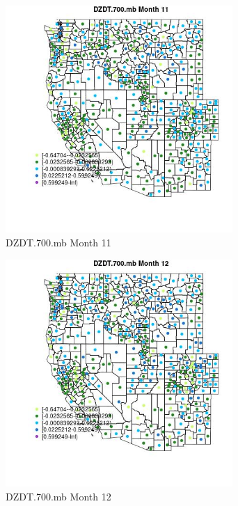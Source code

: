 \begin{figure} 
\centering  
\includegraphics[width=0.77\textwidth]{Code_Outputs/df_report_ML_predictors_CountyCentroid_Locations_Dates_2008-01-01to2018-12-31_MapObsMo11DZDT700mb.jpg} 
\caption{\label{fig:df_report_ML_predictors_CountyCentroid_Locations_Dates_2008-01-01to2018-12-31MapObsMo11DZDT700mb}DZDT.700.mb Month 11} 
\end{figure} 
 

\begin{figure} 
\centering  
\includegraphics[width=0.77\textwidth]{Code_Outputs/df_report_ML_predictors_CountyCentroid_Locations_Dates_2008-01-01to2018-12-31_MapObsMo12DZDT700mb.jpg} 
\caption{\label{fig:df_report_ML_predictors_CountyCentroid_Locations_Dates_2008-01-01to2018-12-31MapObsMo12DZDT700mb}DZDT.700.mb Month 12} 
\end{figure} 
 

